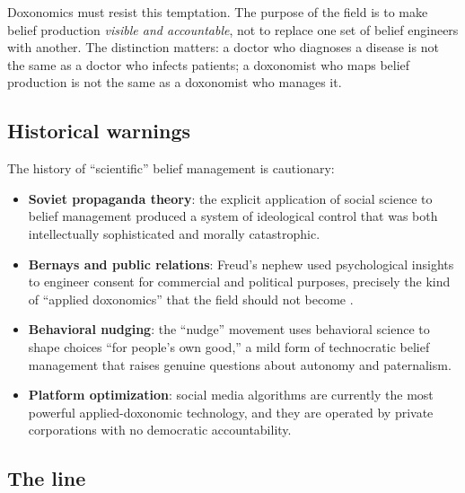 Doxonomics must resist this temptation.
The purpose of the field is to make belief production \emph{visible and accountable}, not to replace one set of belief engineers with another.
The distinction matters: a doctor who diagnoses a disease is not the same as a doctor who infects patients; a doxonomist who maps belief production is not the same as a doxonomist who manages it.

\subsection{Historical warnings}

The history of ``scientific'' belief management is cautionary:
\begin{itemize}[nosep]
  \item \textbf{Soviet propaganda theory}: the explicit application of social science to belief management produced a system of ideological control that was both intellectually sophisticated and morally catastrophic.
  \item \textbf{Bernays and public relations}: Freud's nephew used psychological insights to engineer consent for commercial and political purposes, precisely the kind of ``applied doxonomics'' that the field should not become \autocite{bernays1928}.
  \item \textbf{Behavioral nudging}: the ``nudge'' movement uses behavioral science to shape choices ``for people's own good,'' a mild form of technocratic belief management that raises genuine questions about autonomy and paternalism.
  \item \textbf{Platform optimization}: social media algorithms are currently the most powerful applied-doxonomic technology, and they are operated by private corporations with no democratic accountability.
\end{itemize}

\subsection{The line}

